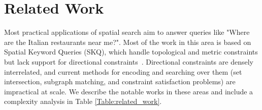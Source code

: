 \section{Related Work}
\label{section:related}
\normalsize
\par{
    Most practical applications of spatial search aim to answer queries like "Where are the Italian restaurants near me?".
    Most of the work in this area is based on Spatial Keyword Queries (SKQ), which handle topological and metric constraints but lack support for directional constraints~\cite{Guo2015, Cao2012, Zhang2009, Osul2023}. 
    Directional constraints are densely interrelated, and current methods for encoding and searching over them (set intersection, subgraph matching, and constraint satisfaction problems) are impractical at scale.
    We describe the notable works in these areas and include a complexity analysis in Table \ref{Table:related_work}.
}


